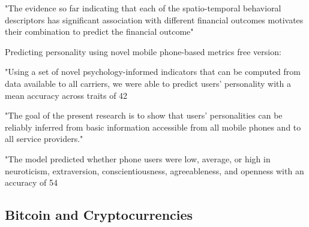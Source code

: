 "The evidence so far indicating that each of the spatio-temporal behavioral descriptors has significant association with different financial outcomes motivates their combination to predict the financial outcome"




Predicting personality using novel mobile phone-based metrics
free version:

"Using a set of novel psychology-informed indicators that can be computed from data available to all carriers, we were able to predict users’ personality with a mean accuracy across traits of 42%

"The goal of the present research is to show that users’ personalities can be reliably inferred from basic information accessible from all mobile phones and to all service providers."


"The model predicted whether phone users were low, average, or high in neuroticism, extraversion, conscientiousness, agreeableness, and openness with an accuracy of 54%


\subsection{Bitcoin and Cryptocurrencies}

